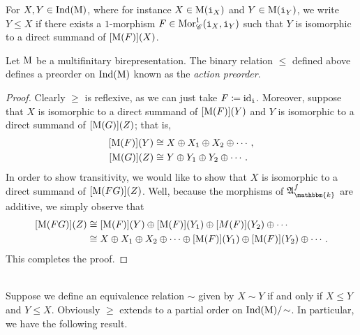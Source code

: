 \noindent For $X, Y \in \textnormal{Ind}(\textnormal{M})$, where for instance $X \in \textnormal{M}(\textnormal{\texttt{i}}_X)$ and $Y \in \textnormal{M}(\textnormal{\texttt{i}}_Y)$, we write $Y \leq X$ if there exists a $1$-morphism $F \in \textnormal{Mor}_\mathscr{C}^1(\textnormal{\texttt{i}}_X, \textnormal{\texttt{i}}_Y)$ such that $Y$ is isomorphic to a direct summand of $[\textnormal{M}(F)](X)$.\\

\noindent\begin{lemma}\label{ActionPreorder} Let $\textnormal{M}$ be a multifinitary birepresentation. The binary relation $\leq$ defined above defines a preorder on $\textnormal{Ind}(\textnormal{M})$ known as the {\em action preorder}.\\
\end{lemma}

\noindent\begin{proof} Clearly $\geq$ is reflexive, as we can just take $F \coloneqq \textnormal{id}_{\textnormal{\texttt{i}}}$. Moreover, suppose that $X$ is isomorphic to a direct summand of $[\textnormal{M}(F)](Y)$ and $Y$ is isomorphic to a direct summand of $[\textnormal{M}(G)](Z)$; that is,
\begin{align*}
\begin{split}
[\textnormal{M}(F)](Y) &\cong X \oplus X_1 \oplus X_2 \oplus \cdots,\\
[\textnormal{M}(G)](Z) &\cong Y \oplus Y_1 \oplus Y_2 \oplus \cdots.
\end{split}
\end{align*}
\noindent In order to show transitivity, we would like to show that $X$ is isomorphic to a direct summand of $[\textnormal{M}(FG)](Z)$. Well, because the morphisms of $\mathfrak{A}_\mathbbm{k}^f$ are additive, we simply observe that
\begin{align*}
\begin{split}
[\textnormal{M}(FG)](Z) &\cong [\textnormal{M}(F)](Y) \oplus [\textnormal{M}(F)](Y_1) \oplus [M(F)](Y_2) \oplus \cdots\\
&\cong X \oplus X_1 \oplus X_2 \oplus \cdots \oplus [\textnormal{M}(F)](Y_1) \oplus [\textnormal{M}(F)](Y_2) \oplus \cdots.
\end{split}
\end{align*}
\noindent This completes the proof.
\end{proof}\\

\noindent Suppose we define an equivalence relation $\sim$ given by $X \sim Y$ if and only if $X \leq Y$ and $Y \leq X$. Obviously $\geq$ extends to a partial order on $\textnormal{Ind}(\textnormal{M})/\!\sim$. In particular, we have the following result.\newpage

